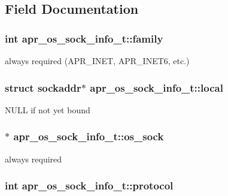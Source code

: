 \subsection{Field Documentation}
\hypertarget{structapr__os__sock__info__t_aa29fd0cf57b0b5e3559961f068fa8b7e}{
\subsubsection[{family}]{\setlength{\rightskip}{0pt plus 5cm}int apr\-\_\-os\-\_\-sock\-\_\-info\-\_\-t\-::family}}\label{structapr__os__sock__info__t_aa29fd0cf57b0b5e3559961f068fa8b7e}
always required (A\-P\-R\-\_\-\-I\-N\-E\-T, A\-P\-R\-\_\-\-I\-N\-E\-T6, etc.) \hypertarget{structapr__os__sock__info__t_afaf470560cbc3088479af708878aa086}{
\subsubsection[{local}]{\setlength{\rightskip}{0pt plus 5cm}struct sockaddr$\ast$ apr\-\_\-os\-\_\-sock\-\_\-info\-\_\-t\-::local}}\label{structapr__os__sock__info__t_afaf470560cbc3088479af708878aa086}
N\-U\-L\-L if not yet bound \hypertarget{structapr__os__sock__info__t_a952464d2f91ca4650e8b4848a81745b5}{
\subsubsection[{os\-\_\-sock}]{$\ast$ apr\-\_\-os\-\_\-sock\-\_\-info\-\_\-t\-::os\-\_\-sock}}\label{structapr__os__sock__info__t_a952464d2f91ca4650e8b4848a81745b5}
always required \hypertarget{structapr__os__sock__info__t_a176ede3ecf40abf0f82a01bfeb95f1e3}{
\subsubsection[{protocol}]{\setlength{\rightskip}{0pt plus 5cm}int apr\-\_\-os\-\_\-sock\-\_\-info\-\_\-t\-::protocol}}\label{structapr__os__sock__info__t_a176ede3ecf40abf0f82a01bfeb95f1e3}
